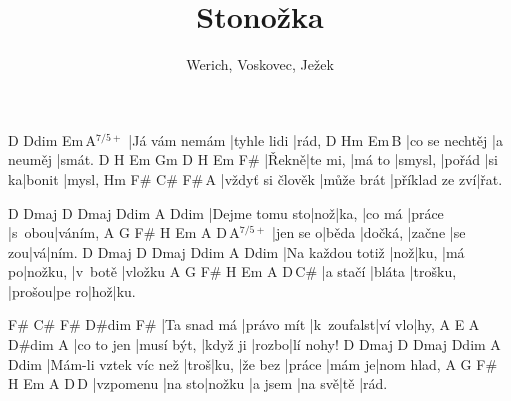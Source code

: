 \documentclass{song}
\title{Stonožka}
\author{Werich, Voskovec, Ježek}
\newcommand{\aug}{$^{7/5+}$}
\begin{document}
\strophe
D             Ddim        Em\7\,A\aug
|Já vám nemám |tyhle lidi |rád,
D              Hm        Em\7\,B\7
|co se nechtěj |a neuměj |smát.
D     H\7     Em     Gm      D      H\7   Em\6   F\#\7
|Řekně|te mi, |má to |smysl, |pořád |si ka|bonit |mysl,
Hm               F\#        C\#\7          F\#\,A\7
|vždyť si člověk |může brát |příklad ze zví|řat.
\endstrophe

\strophe
D              Dmaj D\6 Dmaj   Ddim   A\7    Ddim
|Dejme tomu sto|nož|ka, |co má |práce |s~obou|váním,
A\7      G     F\#\7   H\7    Em\7   A\7 D\,A\aug
|jen se o|běda |dočká, |začne |se zou|vá|ním.
D                Dmaj D\6 Dmaj  Ddim    A\7     Ddim
|Na každou totiž |nož|ku, |má po|nožku, |v~botě |vložku
A\7      G      F\#\7    H\7    Em\7  A\7 D\,C\#\7
|a stačí |bláta |trošku, |prošou|pe ro|hož|ku.
\endstrophe

\strophe
F\#         C\#\7      F\#        D\#dim F\#
|Ta snad má |právo mít |k~zoufalst|ví vlo|hy,
A          E\7        A        D\#dim A
|co to jen |musí být, |když ji |rozbo|lí nohy!
D                     Dmaj D\6  Dmaj    Ddim   A\7    Ddim
|Mám-li vztek víc než |troš|ku, |že bez |práce |mám je|nom hlad,
A\7       G      F\#\7  H\7     Em\7   A\7 D\,D\6
|vzpomenu |na sto|nožku |a jsem |na svě|tě |rád.
\endstrophe

\end{document}
